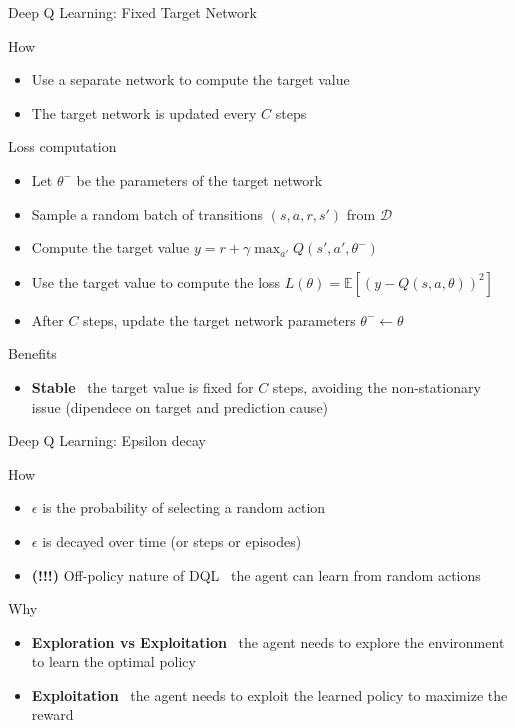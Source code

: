 \documentclass[presentation, 9pt]{beamer}\mode<presentation>{\usetheme{AMSBolognaFC}}
\begin{document}
\begin{frame}{Deep Q Learning: Fixed Target Network}
	\centering
	\begin{block}{How}
		\begin{itemize}
			\item Use a separate network to compute the target value
			\item The target network is updated every $C$ steps
		\end{itemize}
	\end{block}
	\begin{block}{Loss computation}
		\begin{itemize}
			\item Let $\theta^-$ be the parameters of the target network
			\item Sample a random batch of transitions $(s, a, r, s')$ from $\mathcal{D}$
			\item Compute the target value $y = r + \gamma \max_{a'} Q(s', a', \theta^-)$
			\item Use the target value to compute the loss $L(\theta) = \mathbb{E}[(y - Q(s, a, \theta))^2]$
			\item After $C$ steps, update the target network parameters $\theta^- \leftarrow \theta$
		\end{itemize}
	\end{block}
	\begin{alertblock}{Benefits}
		\begin{itemize}
			\item \textbf{Stable} \faArrowRight \, the target value is fixed for $C$ steps, avoiding the non-stationary issue (dipendece on target and prediction cause)
		\end{itemize}
	\end{alertblock}
\end{frame}
\begin{frame}{Deep Q Learning: Epsilon decay}
	\begin{block}{How}
		\begin{itemize}
			\item $\epsilon$ is the probability of selecting a random action
			\item $\epsilon$ is decayed over time (or steps or episodes)
			\item \textbf{(!!!)} Off-policy nature of DQL \faArrowRight \, the agent can learn from random actions
		\end{itemize}
	\end{block}
	\begin{block}{Why}
		\begin{itemize}
			\item \textbf{Exploration vs Exploitation} \faArrowRight \, the agent needs to explore the environment to learn the optimal policy
			\item \textbf{Exploitation} \faArrowRight \, the agent needs to exploit the learned policy to maximize the reward
		\end{itemize}
	\end{block}
	
\end{frame}
\end{document}
